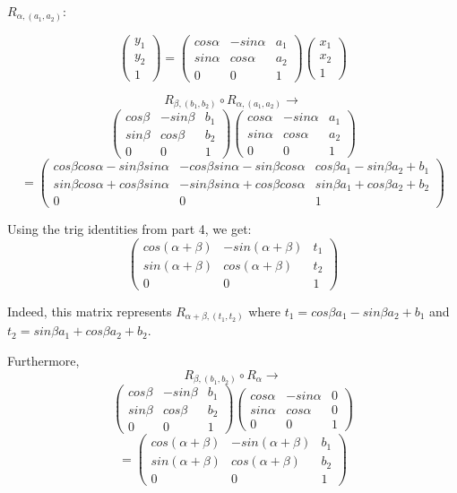 \documentclass[12pt]{article}
\begin{document}
$R_{\alpha,(a_1,a_2)}:$

$$\begin{pmatrix}
y_1\\y_2\\1
\end{pmatrix}=\begin{pmatrix}
cos\alpha & -sin \alpha & a_1\\ sin\alpha & cos\alpha & a_2 \\ 0&0&1
\end{pmatrix}\begin{pmatrix}
x_1\\x_2\\1
\end{pmatrix}$$

$$R_{\beta,(b_1,b_2)}\circ R_{\alpha,(a_1,a_2)}\rightarrow$$
$$
\begin{pmatrix}
cos\beta & -sin\beta & b_1\\ sin\beta & cos\beta & b_2 \\ 0&0&1
\end{pmatrix}\begin{pmatrix}
cos\alpha & -sin \alpha & a_1\\ sin\alpha & cos\alpha & a_2 \\ 0&0&1
\end{pmatrix}$$
$$= \begin{pmatrix}
cos\beta cos\alpha - sin\beta sin\alpha & -cos\beta sin\alpha - sin\beta cos\alpha & cos\beta a_1 - sin\beta a_2 + b_1\\
sin\beta cos\alpha + cos\beta sin\alpha & -sin\beta sin\alpha + cos\beta cos\alpha & sin\beta a_1 + cos\beta a_2 + b_2 \\0&0&1

\end{pmatrix}$$

Using the trig identities from part 4, we get:
$$\begin{pmatrix}
cos(\alpha + \beta)& -sin(\alpha + \beta) & t_1\\
sin(\alpha + \beta) & cos(\alpha + \beta) & t_2 \\
0&0&1
\end{pmatrix}$$

Indeed, this matrix represents $R_{\alpha + \beta,(t_1,t_2)}$ where $t_1 = cos\beta a_1 - sin \beta a_2 + b_1$ and $t_2 = sin\beta a_1 + cos\beta a_2 + b_2$.

Furthermore, 
$$R_{\beta,(b_1,b_2)} \circ R_{\alpha} \rightarrow$$
$$
\begin{pmatrix}
cos\beta & -sin\beta & b_1\\ sin\beta & cos\beta & b_2 \\ 0&0&1
\end{pmatrix}\begin{pmatrix}
cos\alpha & -sin\alpha & 0\\ sin\alpha & cos\alpha & 0 \\ 0&0&1
\end{pmatrix}$$
$$=\begin{pmatrix}
cos(\alpha + \beta)& -sin(\alpha + \beta) & b_1\\
sin(\alpha + \beta) & cos(\alpha + \beta) & b_2 \\
0&0&1
\end{pmatrix}$$
\end{document}

